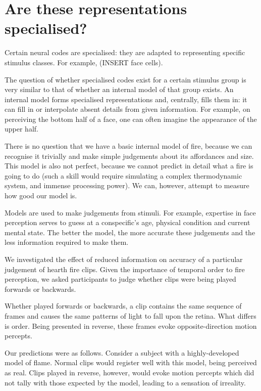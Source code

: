 \documentclass{jov}
\begin{document}
\section{Are these representations specialised?}

Certain neural codes are specialised: they are adapted to representing specific stimulus classes. For example, (INSERT face cells).

The question of whether specialised codes exist for a certain stimulus group is very similar to that of whether an internal model of that group exists. An internal model forms specialised representations and, centrally, fills them in: it can fill in or interpolate absent details from given information. For example, on perceiving the bottom half of a face, one can often imagine the appearance of the upper half.

There is no question that we have a basic internal model of fire, because we can recognise it trivially and make simple judgements about its affordances and size. This model is also not perfect, because we cannot predict in detail what a fire is going to do (such a skill would require simulating a complex thermodynamic system, and immense processing power). We can, however, attempt to measure how good our model is.

Models are used to make judgements from stimuli. For example, expertise in face perception serves to guess at a conspecific's age, physical condition and current mental state. The better the model, the more accurate these judgements and the less information required to make them.

 We investigated the effect of reduced information on accuracy of a particular judgement of hearth fire clips. Given the importance of temporal order to fire perception, we asked participants to judge whether clips were being played forwards or backwards.

Whether played forwards or backwards, a clip contains the same sequence of frames and causes the same patterns of light to fall upon the retina. What differs is order. Being presented in reverse, these frames evoke opposite-direction motion percepts.

Our predictions were as follows. Consider a subject with a highly-developed model of flame. Normal clips would register well with this model, being perceived as real. Clips played in reverse, however, would evoke motion percepts which did not tally with those expected by the model, leading to a sensation of irreality.
\end{document}
